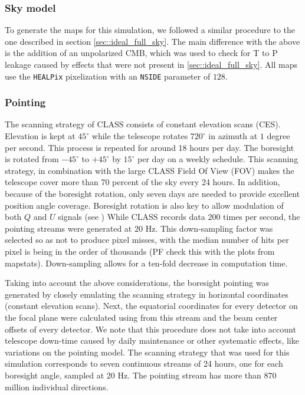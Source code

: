 \documentclass[a4paper,11pt]{article}
\begin{document}
\subsubsection{Sky model}

To generate the maps for this simulation, we followed a similar procedure to the one described in section \ref{sec::ideal_full_sky}. The main difference with the above is the addition of an unpolarized CMB, which was used to check for T to P leakage caused by effects that were not present in \ref{sec::ideal_full_sky}. All maps use the \texttt{HEALPix} pixelization with an \texttt{NSIDE} parameter of $128$. 

\subsubsection{Pointing}

The scanning strategy of CLASS consists of constant elevation scans (CES). Elevation is kept at $45^{\circ}$ while the telescope rotates $720^\circ$ in azimuth at $1$ degree per second. This process is repeated for around 18 hours per day. The boresight is rotated from $-45^{\circ}$ to $+45^{\circ}$ by $15^{\circ}$ per day on a weekly schedule. This scanning strategy, in combination with the large CLASS Field Of View (FOV) makes the telescope cover more than 70 percent of the sky every 24 hours. In addition, because of the boresight rotation, only seven days are needed to provide excellent position angle coverage. Boresight rotation is also key to allow modulation of both $Q$ and $U$ signals (see \cite{2016SPIE.9914E..1KH}) While CLASS records data $200$ times per second, the pointing streams were generated at $20$ Hz. This down-sampling factor was selected so as not to produce pixel misses, with the median number of hits per pixel is being in the order of thousands (PF check this with the plots from mapstats). Down-sampling allows for a ten-fold decrease in computation time.

Taking into account the above considerations, the boresight pointing was generated by closely emulating the scanning strategy in horizontal coordinates (constant elevation scans). Next, the equatorial coordinates for every detector on the focal plane were calculated using from this stream and the beam center offsets of every detector. We note that this procedure does not take into account telescope down-time caused by daily maintenance or other systematic effects, like variations on the pointing model. The scanning strategy that was used for this simulation corresponds to seven continuous streams of 24 hours, one for each boresight angle, sampled at $20$ Hz. The pointing stream has more than 870 million individual directions. 
\end{document}
